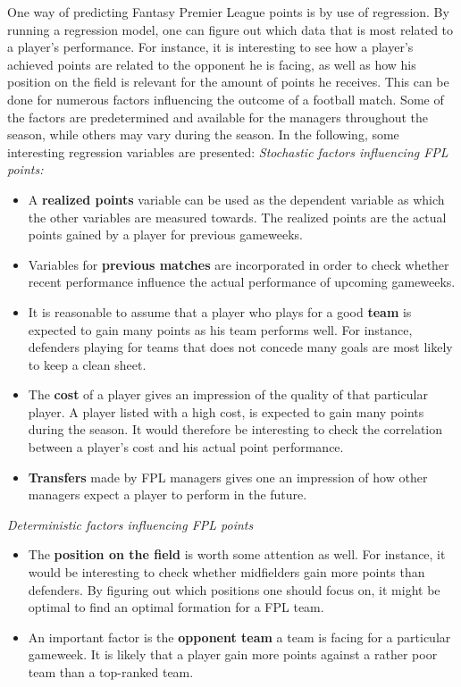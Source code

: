 One way of predicting Fantasy Premier League points is by use of regression. By running a regression model, one can figure out which data that is most related to a player's performance. For instance, it is interesting to see how a player's achieved points are related to the opponent he is facing, as well as how his position on the field is relevant for the amount of points he receives. This can be done for numerous factors influencing the outcome of a football match. Some of the factors are predetermined and available for the managers throughout the season, while others may vary during the season. In the following, some interesting regression variables are presented: 
\newpar
\textit{Stochastic factors influencing FPL points:}
\newpar
\begin{itemize}
    \item A \textbf{realized points} variable can be used as the dependent variable as which the other variables are measured towards. The realized points are the actual points gained by a player for previous gameweeks.
    \item Variables for \textbf{previous matches} are incorporated in order to check whether recent performance influence the actual performance of upcoming gameweeks.
    \item It is reasonable to assume that a player who plays for a good \textbf{team} is expected to gain many points as his team performs well. For instance, defenders playing for teams that does not concede many goals are most likely to keep a clean sheet.
    \item The \textbf{cost} of a player gives an impression of the quality of that particular player. A player listed with a high cost, is expected to gain many points during the season. It would therefore be interesting to check the correlation between a player's cost and his actual point performance. 
    \item \textbf{Transfers} made by FPL managers gives one an impression of how other managers expect a player to perform in the future.
    \end{itemize}
\newpar
\textit{Deterministic factors influencing FPL points}
\newpar
\begin{itemize}
    \item The \textbf{position on the field} is worth some attention as well. For instance, it would be interesting to check whether midfielders gain more points than defenders. By figuring out which positions one should focus on, it might be optimal to find an optimal formation for a FPL team.
    \item An important factor is the \textbf{opponent team} a team is facing for a particular gameweek. It is likely that a player gain more points against a rather poor team than a top-ranked team. 
\end{itemize}





